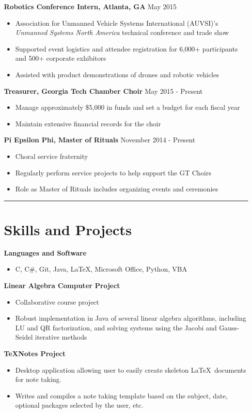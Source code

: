 \documentclass[11pt]{article}
\begin{document}
\textbf{Robotics Conference Intern, Atlanta, GA} \hfill May 2015
\begin{itemize}
\setlength\itemsep{0.5pt}
    \item Association for Unmanned Vehicle Systems International (AUVSI)'s \emph{Unmanned Systems North America} technical conference and trade show
    \item Supported event logistics and attendee registration for 6,000+ participants and 500+ corporate exhibitors
    \item Assisted with product demonstrations of drones and robotic vehicles
\end{itemize}

\textbf{Treasurer, Georgia Tech Chamber Choir} \hfill May 2015 - Present
\begin{itemize}
\setlength\itemsep{0.5pt}
    \item Manage approximately \$5,000 in funds and set a budget for each fiscal year
    \item Maintain extensive financial records for the choir
\end{itemize}

\textbf{Pi Epsilon Phi, Master of Rituals} \hfill November 2014 - Present
\begin{itemize}
\setlength\itemsep{0.5pt}
    \item Choral service fraternity
    \item Regularly perform service projects to help support the GT Choirs
    \item Role as Master of Rituals includes organizing events and ceremonies
\end{itemize}

\rule{\textwidth}{.5pt}

\section*{Skills and Projects}
\textbf{Languages and Software}
\begin{itemize}
\setlength\itemsep{0.5pt}
    \item C, C\#, Git, Java, \LaTeX, Microsoft Office, Python, VBA
\end{itemize}

\textbf{Linear Algebra Computer Project}
\begin{itemize}
\setlength\itemsep{0.5pt}
    \item Collaborative course project
    \item Robust implementation in Java of several linear algebra algorithms, including LU and QR factorization, and solving systems using the Jacobi and Gauss-Seidel iterative methods
\end{itemize}

\textbf{TeXNotes Project}
\begin{itemize}
\setlength\itemsep{0.5pt}
    \item Desktop application allowing user to easily create skeleton \LaTeX\ documents for note taking.
    \item Writes and compiles a note taking template based on the subject, date, optional packages selected by the user, etc. 
\end{itemize}
\end{document}
